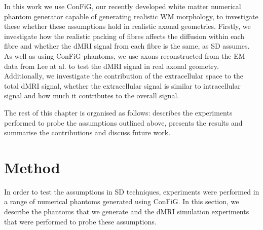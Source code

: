 In this work we use \ac{ConFiG}, our recently developed white matter numerical phantom generator capable of generating realistic WM morphology, to investigate these whether these assumptions hold in realistic axonal geometries.
Firstly, we investigate how the realistic packing of fibres affects the diffusion within each fibre and whether the dMRI signal from each fibre is the same, as \ac{SD} assumes.
As well as using \ac{ConFiG} phantoms, we use axons reconstructed from the \ac{EM} data from Lee at al. \cite{Lee2019b} to test the \ac{dMRI} signal in real axonal geometry.
Additionally, we investigate the contribution of the extracellular space to the total \ac{dMRI} signal, whether the extracellular signal is similar to intracellular signal and how much it contributes to the overall signal.

The rest of this chapter is organised as follows:  describes the experiments performed to probe the assumptions outlined above,  presents the results and  summarise the contributions and discuss future work.
\section{Method}
\label{sec:frf_method}
In order to test the assumptions in \ac{SD} techniques, experiments were performed in a range of numerical phantoms generated using ConFiG. In this section, we describe the phantoms that we generate and the \ac{dMRI} simulation experiments that were performed to probe these assumptions. 

